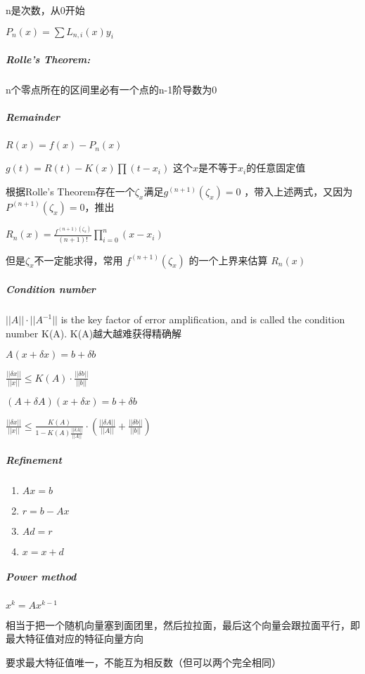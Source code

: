 \documentclass[]{article}
\let\oldsubparagraph\subparagraph
\renewcommand{\subparagraph}[1]{\oldsubparagraph{#1}\mbox{}}
\begin{document}
\begin{multicols}{3}
n是次数，从0开始

\(P_n(x) = \sum {L_{n,i}(x) y_i}\)

\subparagraph{Rolle's Theorem:}\label{header-c265}

n个零点所在的区间里必有一个点的n-1阶导数为0

\subparagraph{Remainder}\label{header-c270}

\( R(x) = f(x) - P_n(x) \)

\( g(t) = R(t) - K(x) \prod (t - x_i) \) 这个\(x\)是不等于\(x_i\)的任意固定值

根据Rolle's Theorem存在一个\(\zeta_x\)满足\(g^{(n+1)}(\zeta_x)=0\)
，带入上述两式，又因为\(P^{(n+1)}(\zeta_x)= 0\)，推出

\(R_n(x) = \frac{f^{(n+1)(\zeta_x)}}{(n+1)!}\prod_{i=0}^n(x - x_i)\)

但是\(\zeta_x\)不一定能求得，常用 \(f^{(n+1)}(\zeta_x)\)
的一个上界来估算 \(R_n(x)\)


\subparagraph{Condition number}\label{header-c284}

\(||A||\cdot ||A^{-1}||\) is the key factor of error amplification, and
is called the condition number K(A). K(A)越大越难获得精确解

\(A(x+\delta x) = b + \delta b\)

\(\frac{||\delta x||}{||x||} \leq K(A) \cdot \frac{||\delta b||}{||b||} \)

\((A+\delta A)(x+\delta x) = b + \delta b\)

\(\frac{||\delta x||}{||x||} \leq \frac{K(A)}{1-K(A) \frac{||\delta A||}{||A||}} \cdot (\frac{||\delta A||}{||A||} + \frac{||\delta b||}{||b||}) \)

\subparagraph{Refinement}\label{header-c304}

\begin{enumerate}
\def\labelenumi{\arabic{enumi}.}
\item
  \(Ax = b\)
\item
  \(r = b - Ax\)
\item
  \(Ad = r\)
\item
  \(x = x + d\)
\end{enumerate}


\subparagraph{Power method}\label{header-c320}

\(x^k = Ax^{k-1}\)

相当于把一个随机向量塞到面团里，然后拉拉面，最后这个向量会跟拉面平行，即最大特征值对应的特征向量方向

要求最大特征值唯一，不能互为相反数（但可以两个完全相同）


\end{multicols}
\end{document}
